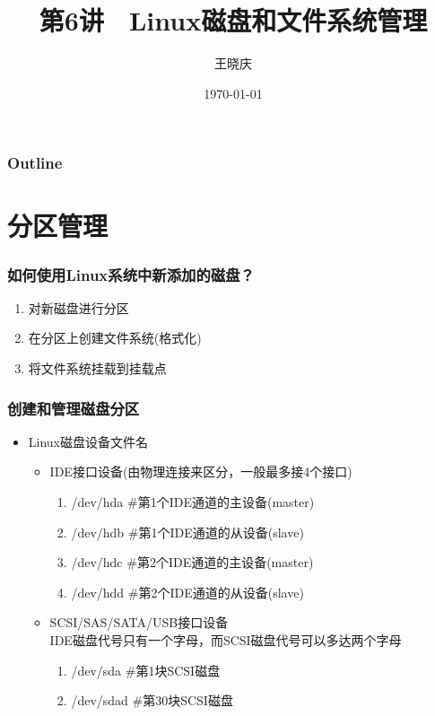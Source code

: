 \documentclass[xcolor=svgnames,presentation]{beamer}
\title{第6讲　Linux磁盘和文件系统管理}
\author{王晓庆}
\date{\today}
\institute{wangxiaoqing@outlook.com}
\begin{document}
\maketitle

\begin{frame}
\frametitle{Outline}
\setcounter{tocdepth}{1}
\tableofcontents
\end{frame}
\section{分区管理}
\label{sec-1}
\begin{frame}
\frametitle{如何使用Linux系统中新添加的磁盘？}
\label{sec-1-1}

\begin{enumerate}
\item 对新磁盘进行分区
\item 在分区上创建文件系统(格式化)
\item 将文件系统挂载到挂载点
\end{enumerate}
\end{frame}
\begin{frame}
\frametitle{创建和管理磁盘分区}
\label{sec-1-2}
\begin{itemize}

\item Linux磁盘设备文件名
\label{sec-1-2-1}%
\begin{itemize}

\item IDE接口设备(由物理连接来区分，一般最多接4个接口)
\label{sec-1-2-1-1}%
\begin{enumerate}
\item /dev/hda \#第1个IDE通道的主设备(master)
\item /dev/hdb \#第1个IDE通道的从设备(slave)
\item /dev/hdc \#第2个IDE通道的主设备(master)
\item /dev/hdd \#第2个IDE通道的从设备(slave)
\end{enumerate}

\item SCSI/SAS/SATA/USB接口设备\\
\label{sec-1-2-1-2}%
IDE磁盘代号只有一个字母，而SCSI磁盘代号可以多达两个字母
\begin{enumerate}
\item /dev/sda   \#第1块SCSI磁盘
\item /dev/sdad  \#第30块SCSI磁盘
\end{enumerate}
\end{itemize} %
\end{itemize} %
\end{frame}
\end{document}
